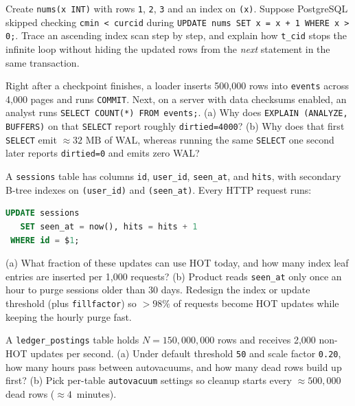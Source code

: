 \begin{exercise}
Create \texttt{nums(x INT)} with rows \texttt{1}, \texttt{2}, \texttt{3} and an index on \texttt{(x)}. Suppose PostgreSQL skipped checking \texttt{cmin < curcid} during \texttt{UPDATE nums SET x = x + 1 WHERE x > 0;}. Trace an ascending index scan step by step, and explain how \texttt{t\_cid} stops the infinite loop without hiding the updated rows from the \emph{next} statement in the same transaction.
\end{exercise}

\begin{exercise}
Right after a checkpoint finishes, a loader inserts 500,000 rows into \texttt{events} across 4,000 pages and runs \texttt{COMMIT}. Next, on a server with data checksums enabled, an analyst runs \texttt{SELECT COUNT(*) FROM events;}.
(a) Why does \texttt{EXPLAIN (ANALYZE, BUFFERS)} on that \texttt{SELECT} report roughly \texttt{dirtied=4000}?
(b) Why does that first \texttt{SELECT} emit $\approx 32\text{ MB}$ of WAL, whereas running the same \texttt{SELECT} one second later reports \texttt{dirtied=0} and emits zero WAL?
\end{exercise}

\begin{exercise}
A \texttt{sessions} table has columns \texttt{id}, \texttt{user\_id}, \texttt{seen\_at}, and \texttt{hits}, with secondary B-tree indexes on \texttt{(user\_id)} and \texttt{(seen\_at)}. Every HTTP request runs:
\begin{lstlisting}[language=SQL]
UPDATE sessions
   SET seen_at = now(), hits = hits + 1
 WHERE id = $1;
\end{lstlisting}
(a) What fraction of these updates can use HOT today, and how many index leaf entries are inserted per 1,000 requests?
(b) Product reads \texttt{seen\_at} only once an hour to purge sessions older than 30 days. Redesign the index or update threshold (plus \texttt{fillfactor}) so $>98\%$ of requests become HOT updates while keeping the hourly purge fast.
\end{exercise}

\begin{exercise}
A \texttt{ledger\_postings} table holds $N = 150{,}000{,}000$ rows and receives 2,000 non-HOT updates per second.
(a) Under default threshold \texttt{50} and scale factor \texttt{0.20}, how many hours pass between autovacuums, and how many dead rows build up first?
(b) Pick per-table \texttt{autovacuum} settings so cleanup starts every $\approx 500{,}000$ dead rows ($\approx 4$~minutes).
\end{exercise}

